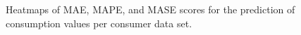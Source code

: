\begin{centering}
\begin{figure}[H]
     \caption[Heatmaps of MAE, MAPE, and MASE scores for the prediction of consumption values]{Heatmaps of MAE, MAPE, and MASE scores for the prediction of consumption values per consumer data set. \quantnet }
\end{figure}
\end{centering}


